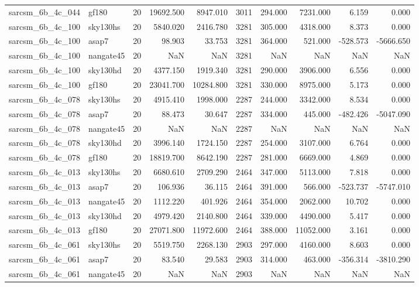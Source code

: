 \documentclass{article}
\begin{document}
\begin{longtable}{llrrrrrrrr}
sarcsm\_6b\_4c\_044 & gf180 & 20 & 19692.500 & 8947.010 & 3011 & 294.000 & 7231.000 & 6.159 & 0.000 \\
sarcsm\_6b\_4c\_100 & sky130hs & 20 & 5840.020 & 2416.780 & 3281 & 305.000 & 4318.000 & 8.373 & 0.000 \\
sarcsm\_6b\_4c\_100 & asap7 & 20 & 98.903 & 33.753 & 3281 & 364.000 & 521.000 & -528.573 & -5666.650 \\
sarcsm\_6b\_4c\_100 & nangate45 & 20 & NaN & NaN & 3281 & NaN & NaN & NaN & NaN \\
sarcsm\_6b\_4c\_100 & sky130hd & 20 & 4377.150 & 1919.340 & 3281 & 290.000 & 3906.000 & 6.556 & 0.000 \\
sarcsm\_6b\_4c\_100 & gf180 & 20 & 23041.700 & 10284.800 & 3281 & 330.000 & 8975.000 & 5.173 & 0.000 \\
sarcsm\_6b\_4c\_078 & sky130hs & 20 & 4915.410 & 1998.000 & 2287 & 244.000 & 3342.000 & 8.534 & 0.000 \\
sarcsm\_6b\_4c\_078 & asap7 & 20 & 88.473 & 30.647 & 2287 & 334.000 & 445.000 & -482.426 & -5047.090 \\
sarcsm\_6b\_4c\_078 & nangate45 & 20 & NaN & NaN & 2287 & NaN & NaN & NaN & NaN \\
sarcsm\_6b\_4c\_078 & sky130hd & 20 & 3996.140 & 1724.150 & 2287 & 254.000 & 3107.000 & 6.764 & 0.000 \\
sarcsm\_6b\_4c\_078 & gf180 & 20 & 18819.700 & 8642.190 & 2287 & 281.000 & 6669.000 & 4.869 & 0.000 \\
sarcsm\_6b\_4c\_013 & sky130hs & 20 & 6680.610 & 2709.290 & 2464 & 347.000 & 5113.000 & 7.818 & 0.000 \\
sarcsm\_6b\_4c\_013 & asap7 & 20 & 106.936 & 36.115 & 2464 & 391.000 & 566.000 & -523.737 & -5747.010 \\
sarcsm\_6b\_4c\_013 & nangate45 & 20 & 1112.220 & 401.926 & 2464 & 354.000 & 2062.000 & 10.702 & 0.000 \\
sarcsm\_6b\_4c\_013 & sky130hd & 20 & 4979.420 & 2140.800 & 2464 & 339.000 & 4490.000 & 5.417 & 0.000 \\
sarcsm\_6b\_4c\_013 & gf180 & 20 & 27071.800 & 11972.600 & 2464 & 388.000 & 11052.000 & 3.161 & 0.000 \\
sarcsm\_6b\_4c\_061 & sky130hs & 20 & 5519.750 & 2268.130 & 2903 & 297.000 & 4160.000 & 8.603 & 0.000 \\
sarcsm\_6b\_4c\_061 & asap7 & 20 & 83.540 & 29.583 & 2903 & 314.000 & 463.000 & -356.314 & -3810.290 \\
sarcsm\_6b\_4c\_061 & nangate45 & 20 & NaN & NaN & 2903 & NaN & NaN & NaN & NaN \\

\end{longtable}
\end{document}
